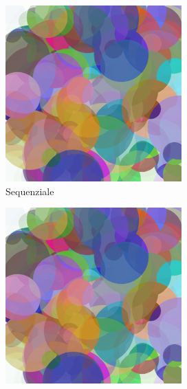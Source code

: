 \documentclass[11pt]{article}
\begin{document}
    \begin{figure}[h!]
        \begin{subfigure}{0.32\textwidth}
            \centering
            \includegraphics[width=\textwidth]{../results/img/seq/10000}
            \caption{Sequenziale}
        \end{subfigure}%
        \hfill
        \begin{subfigure}{0.32\textwidth}
            \centering
            \includegraphics[width=\textwidth]{../results/img/par/10000}

\end{subfigure}
\end{figure}
\end{document}
